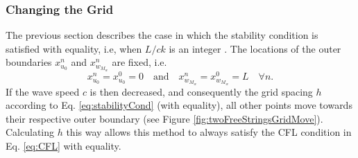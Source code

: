 \subsubsection{Changing the Grid}\label{sec:changingGrid}
The previous section describes the case in which the stability condition is satisfied with equality, i.e, when $L/ck$ is an integer%
. The locations of the outer boundaries $x_{u_0}^n$ and $x_{w_{M_w}}^n$ are fixed, i.e.
\begin{equation*}
    x_{u_0}^n = x_{u_0}^0 = 0 \quad \text{and}\quad x_{w_{M_w}}^n = x_{w_{M_w}}^0 = L \quad \forall n.
\end{equation*}
If the wave speed $c$ is then decreased, and consequently the grid spacing $h$ according to Eq. \eqref{eq:stabilityCond} (with equality), all other points move towards their respective outer boundary (see Figure \ref{fig:twoFreeStringsGridMove}). Calculating $h$ this way allows this method to always satisfy the CFL condition in Eq. \eqref{eq:CFL} with equality. %


